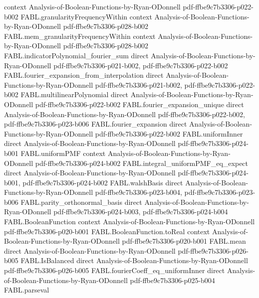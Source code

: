 \begin{theorem}
  {context}
  {Analysis-of-Boolean-Functions-by-Ryan-ODonnell}
  {pdf-ffbe9c7b3306-p022-b002}
\proofstep
  {FABL.granularityFrequencyWithin}
  {context}
  {Analysis-of-Boolean-Functions-by-Ryan-ODonnell}
  {pdf-ffbe9c7b3306-p028-b002}
\proofstep
  {FABL.mem_granularityFrequencyWithin}
  {context}
  {Analysis-of-Boolean-Functions-by-Ryan-ODonnell}
  {pdf-ffbe9c7b3306-p028-b002}
\proofstep
  {FABL.indicatorPolynomial_fourier_sum}
  {direct}
  {Analysis-of-Boolean-Functions-by-Ryan-ODonnell}
  {pdf-ffbe9c7b3306-p021-b002,
    pdf-ffbe9c7b3306-p022-b002}
\proofstep
  {FABL.fourier_expansion_from_interpolation}
  {direct}
  {Analysis-of-Boolean-Functions-by-Ryan-ODonnell}
  {pdf-ffbe9c7b3306-p021-b002,
    pdf-ffbe9c7b3306-p022-b002}
\proofstep
  {FABL.multilinearPolynomial}
  {direct}
  {Analysis-of-Boolean-Functions-by-Ryan-ODonnell}
  {pdf-ffbe9c7b3306-p022-b002}
\proofstep
  {FABL.fourier_expansion_unique}
  {direct}
  {Analysis-of-Boolean-Functions-by-Ryan-ODonnell}
  {pdf-ffbe9c7b3306-p022-b002,
    pdf-ffbe9c7b3306-p023-b006}
\proofstep
  {FABL.fourier_expansion}
  {direct}
  {Analysis-of-Boolean-Functions-by-Ryan-ODonnell}
  {pdf-ffbe9c7b3306-p022-b002}
\proofstep
  {FABL.uniformInner}
  {direct}
  {Analysis-of-Boolean-Functions-by-Ryan-ODonnell}
  {pdf-ffbe9c7b3306-p024-b001}
\proofstep
  {FABL.uniformPMF}
  {context}
  {Analysis-of-Boolean-Functions-by-Ryan-ODonnell}
  {pdf-ffbe9c7b3306-p024-b002}
\proofstep
  {FABL.integral_uniformPMF_eq_expect}
  {direct}
  {Analysis-of-Boolean-Functions-by-Ryan-ODonnell}
  {pdf-ffbe9c7b3306-p024-b001,
    pdf-ffbe9c7b3306-p024-b002}
\proofstep
  {FABL.walshBasis}
  {direct}
  {Analysis-of-Boolean-Functions-by-Ryan-ODonnell}
  {pdf-ffbe9c7b3306-p023-b004,
    pdf-ffbe9c7b3306-p023-b006}
\proofstep
  {FABL.parity_orthonormal_basis}
  {direct}
  {Analysis-of-Boolean-Functions-by-Ryan-ODonnell}
  {pdf-ffbe9c7b3306-p024-b003,
    pdf-ffbe9c7b3306-p024-b004}
\proofstep
  {FABL.BooleanFunction}
  {context}
  {Analysis-of-Boolean-Functions-by-Ryan-ODonnell}
  {pdf-ffbe9c7b3306-p020-b001}
\proofstep
  {FABL.BooleanFunction.toReal}
  {context}
  {Analysis-of-Boolean-Functions-by-Ryan-ODonnell}
  {pdf-ffbe9c7b3306-p020-b001}
\proofstep
  {FABL.mean}
  {direct}
  {Analysis-of-Boolean-Functions-by-Ryan-ODonnell}
  {pdf-ffbe9c7b3306-p026-b005}
\proofstep
  {FABL.IsBalanced}
  {direct}
  {Analysis-of-Boolean-Functions-by-Ryan-ODonnell}
  {pdf-ffbe9c7b3306-p026-b005}
\proofstep
  {FABL.fourierCoeff_eq_uniformInner}
  {direct}
  {Analysis-of-Boolean-Functions-by-Ryan-ODonnell}
  {pdf-ffbe9c7b3306-p025-b004}
\proofstep
  {FABL.parseval}

\end{theorem}
